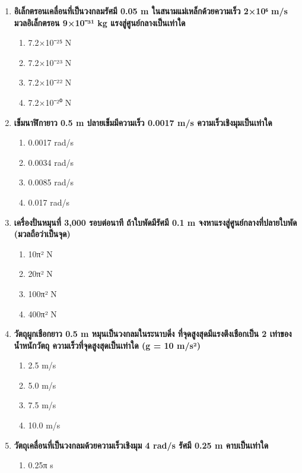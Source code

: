 \documentclass[12pt]{article}
\begin{document}
\begin{enumerate}
\begin{enumerate}[label=\alph*)]
\item 18 N
\item 23 N
\item 28 N
\item 33 N
\end{enumerate}
\item \textbf{อิเล็กตรอนเคลื่อนที่เป็นวงกลมรัศมี 0.05 m ในสนามแม่เหล็กด้วยความเร็ว 2×10⁶ m/s มวลอิเล็กตรอน 9×10⁻³¹ kg แรงสู่ศูนย์กลางเป็นเท่าใด}
\begin{enumerate}[label=\alph*)]
\item 7.2×10⁻²⁵ N
\item 7.2×10⁻²³ N
\item 7.2×10⁻²² N
\item 7.2×10⁻²⁰ N
\end{enumerate}
\item \textbf{เข็มนาฬิกายาว 0.5 m ปลายเข็มมีความเร็ว 0.0017 m/s ความเร็วเชิงมุมเป็นเท่าใด}
\begin{enumerate}[label=\alph*)]
\item 0.0017 rad/s
\item 0.0034 rad/s
\item 0.0085 rad/s
\item 0.017 rad/s
\end{enumerate}
\item \textbf{เครื่องปั่นหมุนที่ 3,000 รอบต่อนาที ถ้าใบพัดมีรัศมี 0.1 m จงหาแรงสู่ศูนย์กลางที่ปลายใบพัด (มวลถือว่าเป็นจุด)}
\begin{enumerate}[label=\alph*)]
\item 10π² N
\item 20π² N
\item 100π² N
\item 400π² N
\end{enumerate}
\item \textbf{วัตถุผูกเชือกยาว 0.5 m หมุนเป็นวงกลมในระนาบดิ่ง ที่จุดสูงสุดมีแรงตึงเชือกเป็น 2 เท่าของน้ำหนักวัตถุ ความเร็วที่จุดสูงสุดเป็นเท่าใด (g = 10 m/s²)}
\begin{enumerate}[label=\alph*)]
\item 2.5 m/s
\item 5.0 m/s
\item 7.5 m/s
\item 10.0 m/s
\end{enumerate}
\item \textbf{วัตถุเคลื่อนที่เป็นวงกลมด้วยความเร็วเชิงมุม 4 rad/s รัศมี 0.25 m คาบเป็นเท่าใด}
\begin{enumerate}[label=\alph*)]
\item 0.25π s

\end{enumerate}
\end{enumerate}
\end{document}
